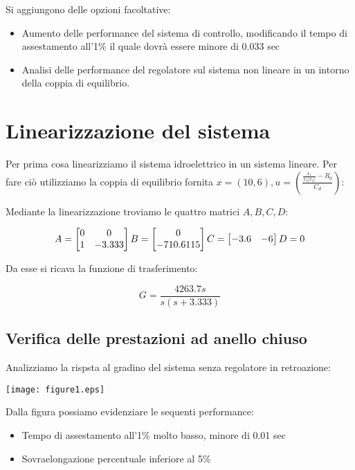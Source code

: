 \documentclass{article}
\begin{document}
Si aggiungono delle opzioni facoltative:
\begin{itemize}
    \item Aumento delle performance del sistema di controllo, modificando il tempo di assestamento all'1\% il quale dovrà essere minore di 0.033 sec
    \item Analisi delle performance del regolatore sul sistema non lineare in un intorno della coppia di equilibrio.
\end{itemize}

\section{Linearizzazione del sistema}

Per prima cosa linearizziamo il sistema idroelettrico in un sistema lineare. Per fare ciò utilizziamo la coppia di equilibrio fornita $x=(10,6), u=(\frac{\frac{x_1}{x_2 |x_2|}-R_0}{C_d})$:

Mediante la linearizzazione troviamo le quattro matrici $A,B,C,D$:

$$
A=
\begin{bmatrix}
    0 & 0\\
    1 & -3.333
\end{bmatrix}
B=
\begin{bmatrix}
    0\\
    -710.6115
\end{bmatrix}\\
C=
\begin{bmatrix}
    -3.6 & -6
\end{bmatrix}
D=0
$$

Da esse si ricava la funzione di trasferimento:

$$
G=\frac{4263.7 s}{s (s+3.333)}
$$

\subsection{Verifica delle prestazioni ad anello chiuso}

Analizziamo la rispsta al gradino del sistema senza regolatore in retroazione:

\begin{center}
    \texttt{[image: figure1.eps]}
\end{center}

Dalla figura possiamo evidenziare le sequenti performance:

\begin{itemize}
    \item Tempo di assestamento all'1\% molto basso, minore di 0.01 sec
    \item Sovraelongazione percentuale inferiore al 5\%
\end{itemize}
\end{document}
